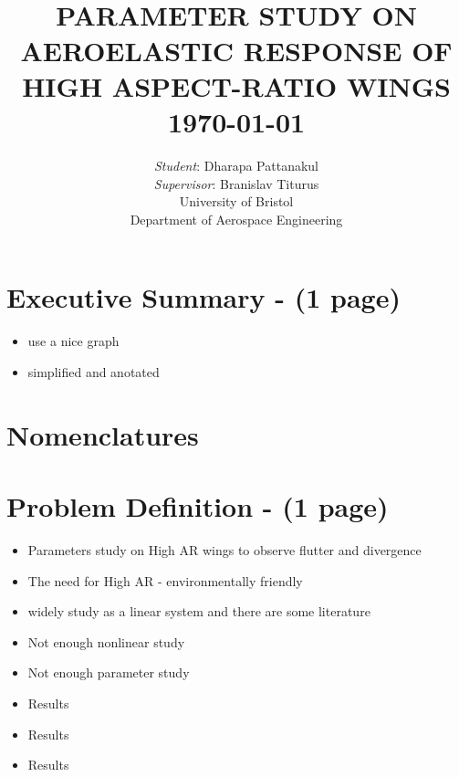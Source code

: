 \documentclass[11pt]{article}
\begin{document}
{\selectfont
\title{ \normalsize \textsc{}
		\\ [2.0cm]
		\HRule{0.5pt} \\
		\LARGE \textbf{\uppercase{Parameter Study on Aeroelastic Response of  High Aspect-Ratio Wings}
		\HRule{2pt} \\ [0.5cm]
		\normalsize \today \vspace*{5\baselineskip}}
		}
}

\date{}

\author{
        \textit{Student}: Dharapa Pattanakul\\ 
        \textit{Supervisor}: Branislav Titurus\\
		University of Bristol \\
		Department of Aerospace Engineering }

\maketitle
\cleardoublepage
\newpage
\section*{Executive Summary - (1 page)}
\begin{itemize}
    \item use a nice graph
    \item simplified and anotated
\end{itemize}
\cleardoublepage

\newpage
\tableofcontents
\newpage
\listoffigures
{}
\cleardoublepage
\listoftables
{}

\section*{Nomenclatures}
\cleardoublepage

\newpage
\section{Problem Definition - (1 page)}
\begin{itemize}
    \item Parameters study on High AR wings to observe flutter and divergence
    \item The need for High AR - environmentally friendly
    \item widely study as a linear system and there are some literature
    \item Not enough nonlinear study
    \item Not enough parameter study
    \item Results
    \item Results
    \item Results
\end{itemize}
\end{document}
